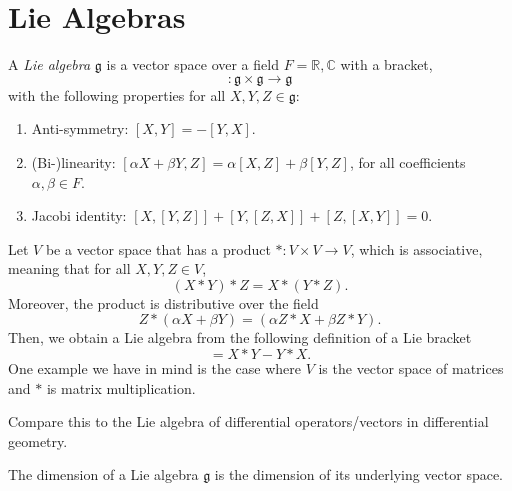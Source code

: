 \chapter{Lie Algebras}%
\label{cha:lie_algebras}

\begin{definition} \label{def:lie_algebra}
  A \emph{Lie algebra} $\mathfrak{g}$ is a vector space over a field $F = \mathbb{R}, \mathbb{C}$ with a bracket, 
  \begin{equation}
    [, ]: \mathfrak{g} \times \mathfrak{g} \to \mathfrak{g}
  \end{equation}
  with the following properties for all $X, Y, Z \in \mathfrak{g}$:
  \begin{enumerate}
    \item Anti-symmetry: $[X, Y] = -[Y, X]$.
    \item (Bi-)linearity: $[\alpha X + \beta Y, Z] = \alpha[X, Z] + \beta [Y, Z]$, for all coefficients $\alpha, \beta \in F$.
    \item Jacobi identity: $[X, [Y, Z] ] + [Y, [Z, X] ] + [Z, [X, Y] ] = 0$.
  \end{enumerate}
\end{definition}

Let $V$ be a vector space that has a product $*: V \times V \to V$, which is associative, meaning that for all $X, Y, Z \in V$,
\begin{equation}
  (X * Y) * Z = X*(Y*Z).
\end{equation}
Moreover, the product is distributive over the field
\begin{equation}
  Z * (\alpha X + \beta Y) = (\alpha Z*X + \beta Z*Y).
\end{equation}
Then, we obtain a Lie algebra from the following definition of a Lie bracket
\begin{equation}
  [X, Y] = X*Y - Y*X.
\end{equation}
One example we have in mind is the case where $V$ is the vector space of matrices and $*$ is matrix multiplication. 
\begin{leftbar}
  \begin{remark}
    Compare this to the Lie algebra of differential operators/vectors in differential geometry.
  \end{remark}
\end{leftbar}

\begin{definition}[dimension]
  The dimension of a Lie algebra $\mathfrak{g}$ is the dimension of its underlying vector space.
\end{definition}

